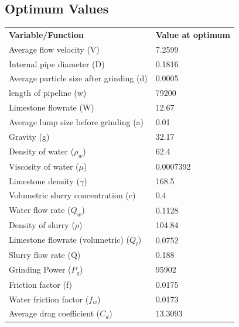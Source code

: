 \documentclass{article}
\begin{document}
\subsection{Optimum Values}
\begin{center}
\begin{tabular}{|l|l|}
	\hline
	\textbf{Variable/Function}               & \textbf{Value at optimum} \\
	Average flow velocity (V)                & 7.2599                    \\
	Internal pipe diameter (D)               & 0.1816                    \\
	\cellcolor{yellow}Average particle size after grinding (d) & 0.0005                    \\
	length of pipeline (w)                   & 79200                     \\
	Limestone flowrate (W)                   & 12.67                     \\
	Average lump size before grinding (a)    & 0.01                      \\
	Gravity (g)                              & 32.17                     \\
	Density of water ($\rho_w$)              & 62.4                      \\
	Viscosity of water ($\mu$)               & 0.0007392                 \\
	Limestone density ($\gamma$)             & 168.5                     \\
	\cellcolor{yellow}Volumetric slurry concentration (c)      & 0.4                       \\
	Water flow rate ($Q_w$)                  & 0.1128                    \\
	Density of slurry ($\rho$)               & 104.84                    \\
	Limestone flowrate (volumetric) ($Q_l$)  & 0.0752                    \\
	Slurry flow rate (Q)                     & 0.188                     \\
	Grinding Power ($P_g$)                   & 95902                     \\
	Friction factor (f)                      & 0.0175                    \\
	Water friction factor ($f_w$)            & 0.0173                    \\
	Average drag coefficient ($C_d$)         & 13.3093                   \\

\end{tabular}
\end{center}
\end{document}
